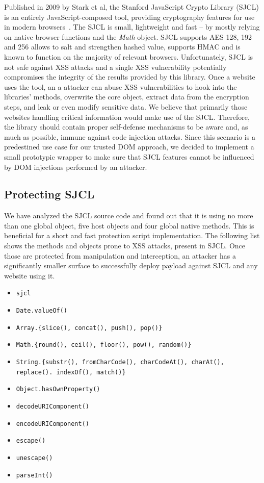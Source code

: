        Published in 2009 by Stark et al, the Stanford JavaScript Crypto Library (SJCL) is an entirely JavaScript-composed tool, providing cryptography features for use in modern browsers~\cite{stark2009symmetric}. The SJCL is small, lightweight and fast -- by mostly relying on native browser functions and the \textit{Math} object. SJCL supports AES 128, 192 and 256 allows to salt and strengthen hashed value, supports HMAC and is known to function on the majority of relevant browsers. Unfortunately, SJCL is not safe against XSS attacks and a single XSS vulnerability potentially compromises the integrity of the results provided by this library. Once a website uses the tool, an a attacker can abuse XSS vulnerabilities to hook into the libraries' methods, overwrite the core object, extract data from the encryption steps, and leak or even modify sensitive data. We believe that primarily those websites handling critical information would make use of the SJCL. Therefore, the library should contain proper self-defense mechanisms to be aware and, as much as possible, immune against code injection attacks. Since this scenario is a predestined use case for our trusted DOM approach, we decided to implement a small prototypic wrapper to make sure that SJCL features cannot be influenced by DOM injections performed by an attacker.\\

      \subsection{Protecting SJCL}
      \label{subsubsubsec:6.6.6.2.protecting_sjcl}

      We have analyzed the SJCL source code and found out that it is using no more than one global object, five host objects and four global native methods. This is beneficial for a short and fast protection script implementation. The following list shows the methods and objects prone to XSS attacks, present in SJCL. Once those are protected from manipulation and interception, an attacker has a significantly smaller surface to successfully deploy payload against SJCL and any website using it.

\begin{itemize}
  \item \texttt{sjcl}
  \item \texttt{Date.valueOf()}
  \item \texttt{Array.\{slice(), concat(), push(), pop()\}}
  \item \texttt{Math.\{round(), ceil(), floor(), pow(), random()\}}
  \item \texttt{String.\{substr(), fromCharCode(), charCodeAt(), charAt(), \\
    replace(). indexOf(), match()\}}
  \item \texttt{Object.hasOwnProperty()}
  \item \texttt{decodeURIComponent()}
  \item \texttt{encodeURIComponent()}
  \item \texttt{escape()}
  \item \texttt{unescape()}
  \item \texttt{parseInt()}
\end{itemize}

